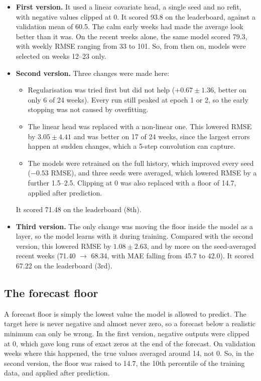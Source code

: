 \documentclass[11pt,a4paper]{article}
\begin{document}
\begin{itemize}
  \item \textbf{First version.} It used a linear covariate head, a single seed and no refit, with negative values clipped at 0. It scored 93.8 on the leaderboard, against a validation mean of 60.5. The calm early weeks had made the average look better than it was. On the recent weeks alone, the same model scored 79.3, with weekly RMSE ranging from 33 to 101. So, from then on, models were selected on weeks 12--23 only.
  \item \textbf{Second version.} Three changes were made here:
  \begin{itemize}
    \item Regularisation was tried first but did not help ($+0.67 \pm 1.36$, better on only 6 of 24 weeks). Every run still peaked at epoch 1 or 2, so the early stopping was not caused by overfitting.
    \item The linear head was replaced with a non-linear one. This lowered RMSE by $3.05 \pm 4.41$ and was better on 17 of 24 weeks, since the largest errors happen at sudden changes, which a 5-step convolution can capture.
    \item The models were retrained on the full history, which improved every seed ($-0.53$ RMSE), and three seeds were averaged, which lowered RMSE by a further 1.5--2.5. Clipping at 0 was also replaced with a floor of 14.7, applied after prediction.
  \end{itemize}
  It scored 71.48 on the leaderboard (8th).
  \item \textbf{Third version.} The only change was moving the floor inside the model as a layer, so the model learns with it during training. Compared with the second version, this lowered RMSE by $1.08 \pm 2.63$, and by more on the seed-averaged recent weeks (71.40 $\to$ 68.34, with MAE falling from 45.7 to 42.0). It scored 67.22 on the leaderboard (3rd).
\end{itemize}

\subsection*{The forecast floor}

A forecast floor is simply the lowest value the model is allowed to predict. The target here is never negative and almost never zero, so a forecast below a realistic minimum can only be wrong. In the first version, negative outputs were clipped at 0, which gave long runs of exact zeros at the end of the forecast. On validation weeks where this happened, the true values averaged around 14, not 0. So, in the second version, the floor was raised to 14.7, the 10th percentile of the training data, and applied after prediction.
\end{document}
